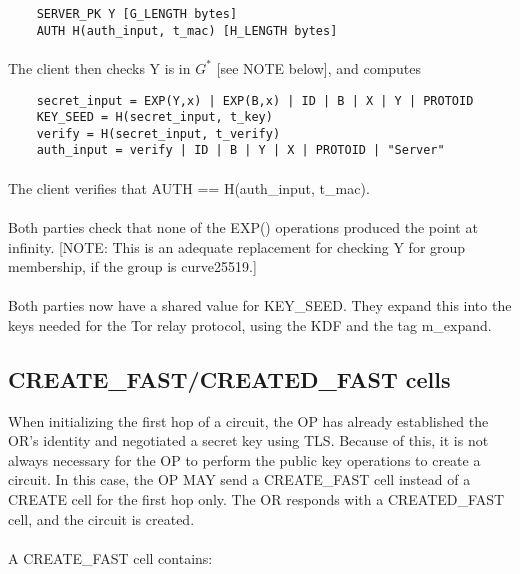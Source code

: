 \begin{verbatim}
    SERVER_PK Y [G_LENGTH bytes]
    AUTH H(auth_input, t_mac) [H_LENGTH bytes]
\end{verbatim}

\paragraph{}
The client then checks Y is in $G^*$ [see NOTE below], and computes

\begin{verbatim}
    secret_input = EXP(Y,x) | EXP(B,x) | ID | B | X | Y | PROTOID
    KEY_SEED = H(secret_input, t_key)
    verify = H(secret_input, t_verify)
    auth_input = verify | ID | B | Y | X | PROTOID | "Server"
\end{verbatim}

\paragraph{}
The client verifies that AUTH == H(auth\_input, t\_mac).

\paragraph{}
Both parties check that none of the EXP() operations produced the
point at infinity. [NOTE: This is an adequate replacement for
checking Y for group membership, if the group is curve25519.]

\paragraph{}
Both parties now have a shared value for KEY\_SEED. They expand this
into the keys needed for the Tor relay protocol, using the KDF
 and the tag m\_expand.

\subsection{CREATE\_FAST/CREATED\_FAST cells}
When initializing the first hop of a circuit, the OP has already
established the OR's identity and negotiated a secret key using TLS.
Because of this, it is not always necessary for the OP to perform the
public key operations to create a circuit. In this case, the
OP MAY send a CREATE\_FAST cell instead of a CREATE cell for the first
hop only. The OR responds with a CREATED\_FAST cell, and the circuit is
created.

\paragraph{}
A CREATE\_FAST cell contains:

